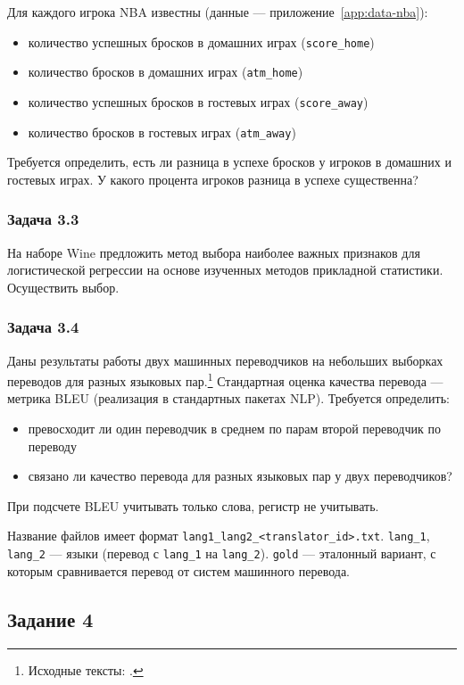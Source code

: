 Для каждого игрока NBA известны (данные --- приложение~\ref{app:data-nba}):
\begin{itemize}
    \item количество успешных бросков в домашних играх (\texttt{score\_home})
    \item количество бросков в домашних играх (\texttt{atm\_home})
    \item количество успешных бросков в гостевых играх (\texttt{score\_away})
    \item количество бросков в гостевых играх (\texttt{atm\_away})
\end{itemize}
Требуется определить, есть ли разница в успехе бросков у игроков в домашних и гостевых играх.
У какого процента игроков разница в успехе существенна?

\subsubsection{Задача 3.3}

На наборе Wine \citep{forina1986} предложить метод выбора наиболее важных признаков для логистической регрессии на основе изученных методов прикладной статистики.
Осуществить выбор.

\subsubsection{Задача 3.4}

Даны результаты работы двух машинных переводчиков на небольших выборках переводов для разных языковых пар.\footnote{Исходные тексты: .}
Стандартная оценка качества перевода --- метрика BLEU \citep{papineni2002} (реализация в стандартных пакетах NLP).
Требуется определить:
\begin{itemize}
    \item превосходит ли один переводчик в среднем по парам второй переводчик по переводу
    \item связано ли качество перевода для разных языковых пар у двух переводчиков?
\end{itemize}
При подсчете BLEU учитывать только слова, регистр не учитывать.

Название файлов имеет формат \texttt{lang1\_lang2\_<translator\_id>.txt}.
\texttt{lang\_1}, \texttt{lang\_2} --- языки (перевод с \texttt{lang\_1} на \texttt{lang\_2}).
\texttt{gold} --- эталонный вариант, с которым сравнивается перевод от систем машинного перевода.

\subsection{Задание 4}



